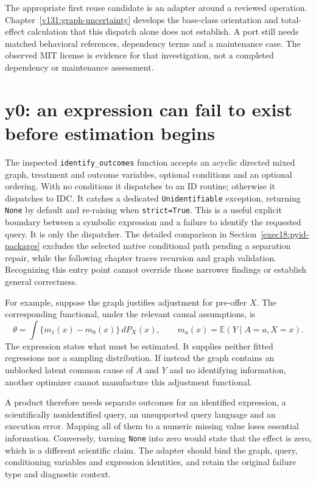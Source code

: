 The appropriate first reuse candidate is an adapter around a reviewed operation.
Chapter~\ref{v131:graph-uncertainty} develops the base-class orientation and
total-effect calculation that this dispatch alone does not establish. A port
still needs matched behavioral references, dependency terms and a maintenance
case. The observed MIT license is evidence for that investigation, not a
completed dependency or maintenance assessment. \citep{v13_sw_lingam}

\section{y0: an expression can fail to exist before estimation begins}

The inspected \texttt{identify\_outcomes} function accepts an acyclic directed
mixed graph, treatment and outcome variables, optional conditions and an optional
ordering. With no conditions it dispatches to an ID routine; otherwise it
dispatches to IDC. It catches a dedicated \texttt{Unidentifiable} exception,
returning \texttt{None} by default and re-raising when \texttt{strict=True}.
This is a useful explicit boundary between a symbolic expression and a failure
to identify the requested query. It is only the dispatcher. The detailed
comparison in Section~\ref{exec18:pyid-packages} excludes the selected native
conditional path pending a separation repair, while the following chapter
traces recursion and graph validation. Recognizing this entry point cannot
override those narrower findings or establish general correctness. \citep{v13_sw_y0}

For example, suppose the graph justifies adjustment for pre-offer $X$. The
corresponding functional, under the relevant causal assumptions, is
\[
 \theta=\int\{m_1(x)-m_0(x)\}\,dP_X(x),
 \qquad m_a(x)=\mathbb E(Y\mid A=a,X=x).
\]
The expression states what must be estimated. It supplies neither fitted
regressions nor a sampling distribution. If instead the graph contains an
unblocked latent common cause of $A$ and $Y$ and no identifying information,
another optimizer cannot manufacture this adjustment functional.

A product therefore needs separate outcomes for an identified expression, a
scientifically nonidentified query, an unsupported query language and an
execution error. Mapping all of them to a numeric missing value loses essential
information. Conversely, turning \texttt{None} into zero would state that the
effect is zero, which is a different scientific claim. The adapter should bind
the graph, query, conditioning variables and expression identities, and retain
the original failure type and diagnostic context.

